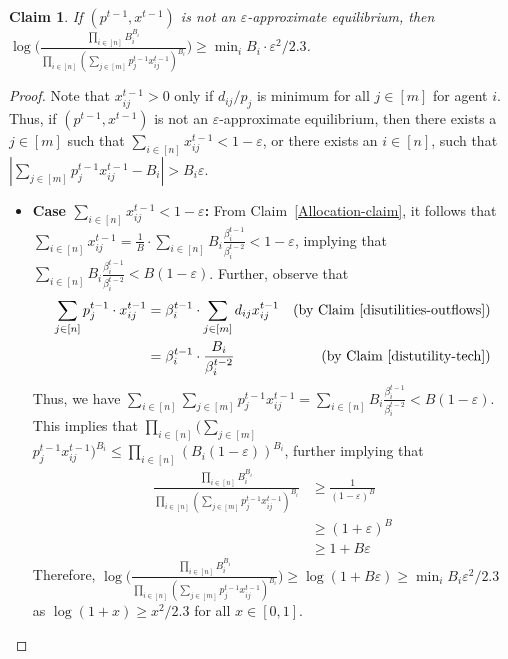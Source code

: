 \documentclass[format=acmsmall,authorversion]{acmart}
\newtheorem{claim}[theorem]{Claim}
\begin{document}
\begin{claim}
\label{progress}
If $( p^{t-1}, x^{t-1} )$ is not an $\varepsilon$-approximate equilibrium, then $\log \Bigg(\frac{\prod_{i\in [n]} B_i^{B_i}}{\prod_{i \in [n]}(\sum_{j \in [m]}p^{t-1}_j x^{t-1}_{ij})^{B_i}} \Bigg) \geq \min_i B_i \cdot \varepsilon^2/2.3$. 
\end{claim}

\begin{proof}
Note that $x^{t-1}_{ij} > 0$ only if $d_{ij}/p_j$ is minimum for all $j \in [m]$ for agent $i$. Thus, if $( p^{t-1}, x^{t-1} )$ is not an $\varepsilon$-approximate equilibrium, then there exists a $j \in [m]$ such that $\sum_{i \in [n]} x^{t-1}_{ij} < 1 - \varepsilon$, or there exists an $i \in [n]$, such that $|\sum_{j \in [m]} p^{t-1}_jx^{t-1}_{ij} - B_i| >  B_i\varepsilon$.

   \begin{itemize}
       \item \textbf{Case $\sum_{i \in [n]} x^{t-1}_{ij} < 1 - \varepsilon$:} From Claim~\ref{Allocation-claim}, it follows that $\sum_{i \in [n]} x^{t-1}_{ij} = \frac{1}{B} \cdot \sum_{i \in [n]} B_i\frac{\beta^{t-1}_i}{\beta^{t-2}_i} < 1 - \varepsilon$, implying that $\sum_{i \in [n]} B_i \frac{\beta^{t-1}_i}{\beta^{t-2}_i} < B(1 - \varepsilon)$. Further, observe that
       \begin{align*}
        \sum_{j \in [n]} p^{t-1}_j \cdot x^{t-1}_{ij} &= \beta^{t-1}_i \cdot \sum_{j \in [m]} d_{ij}x^{t-1}_{ij} &\text{(by Claim~\ref{disutilities-outflows})}\\
        &= \beta^{t-1}_i \cdot \frac{B_i}{\beta^{t-2}_i} &\text{(by Claim~\ref{distutility-tech})}
    \end{align*}
    Thus, we have $\sum_{i \in [n]} \sum_{j \in [m]} p^{t-1}_j x^{t-1}_{ij} = \sum_{i \in [n]} B_i \frac{\beta^{t-1}_i}{\beta^{t-2}_i} < B(1-\varepsilon)$. This implies that $\prod_{i \in [n]} (\sum_{j \in [m]} $ $ p^{t-1}_j x^{t-1}_{ij})^{B_i} \leq \prod_{i \in [n]} (B_i(1-\varepsilon))^{B_i}$, further implying that 
    \begin{align*}
        \frac{\prod_{i \in [n]} B_i^{B_i}}{\prod_{i \in [n]} (\sum_{j \in [m]} p^{t-1}_j x^{t-1}_{ij})^{B_i}} &\geq \frac{1}{(1-\varepsilon)^B}\\
                                                                   &\geq (1+\varepsilon)^B\\
                                                                   &\geq 1 + {B\varepsilon }
    \end{align*}
    Therefore, $\log \Bigg( \frac{\prod_{i \in [n]} B_i^{B_i}}{\prod_{i \in [n]} (\sum_{j \in [m]} p^{t-1}_j x^{t-1}_{ij})^{B_i}} \Bigg) \geq \log(1+B\varepsilon) \geq \min_i B_i \varepsilon^2/2.3$ as $\log(1+x) \geq x^2/2.3$ for all $x \in [0,1]$.


\end{itemize}
\end{proof}
\end{document}
